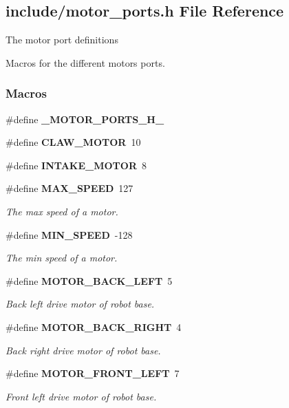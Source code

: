 \subsection{include/motor\+\_\+ports.h File Reference}
\label{motor__ports_8h}


The motor port definitions

Macros for the different motors ports.  


\subsubsection*{Macros}
\begin{DoxyCompactItemize}
\item 
\#define \textbf{ \+\_\+\+M\+O\+T\+O\+R\+\_\+\+P\+O\+R\+T\+S\+\_\+\+H\+\_\+}
\item 
\#define \textbf{ C\+L\+A\+W\+\_\+\+M\+O\+T\+OR}~10
\item 
\#define \textbf{ I\+N\+T\+A\+K\+E\+\_\+\+M\+O\+T\+OR}~8
\item 
\#define \textbf{ M\+A\+X\+\_\+\+S\+P\+E\+ED}~127
\begin{DoxyCompactList}\small\item\em The max speed of a motor. \end{DoxyCompactList}\item 
\#define \textbf{ M\+I\+N\+\_\+\+S\+P\+E\+ED}~-\/128
\begin{DoxyCompactList}\small\item\em The min speed of a motor. \end{DoxyCompactList}\item 
\#define \textbf{ M\+O\+T\+O\+R\+\_\+\+B\+A\+C\+K\+\_\+\+L\+E\+FT}~5
\begin{DoxyCompactList}\small\item\em Back left drive motor of robot base. \end{DoxyCompactList}\item 
\#define \textbf{ M\+O\+T\+O\+R\+\_\+\+B\+A\+C\+K\+\_\+\+R\+I\+G\+HT}~4
\begin{DoxyCompactList}\small\item\em Back right drive motor of robot base. \end{DoxyCompactList}\item 
\#define \textbf{ M\+O\+T\+O\+R\+\_\+\+F\+R\+O\+N\+T\+\_\+\+L\+E\+FT}~7
\begin{DoxyCompactList}\small\item\em Front left drive motor of robot base. \end{DoxyCompactList}\item 

\end{DoxyCompactItemize}
